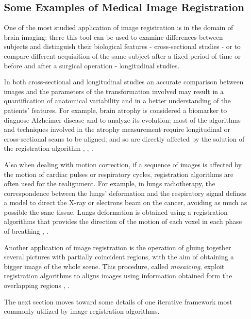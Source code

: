 \subsection{Some Examples of Medical Image Registration}
One of the most studied application of image registration is in the domain of brain imaging: there this tool can be used to examine differences between subjects and distinguish their biological features - cross-sectional studies - or to compare different acquisition of the same subject after a fixed period of time or before and after a surgical operation - longitudinal studies. 

In both cross-sectional and longitudinal studies an accurate comparison between images and the parameters of the transformation involved may result in a quantification of anatomical variability and in a better understanding of the patients' features. 
%
For example, brain atrophy is considered a biomarker to diagnose Alzheimer disease and to analyze its evolution; most of the algorithms and techniques involved in the atrophy measurement require longitudinal or cross-sectional scans to be aligned, and so are directly affected by the solution of the registration algorithm \cite{prados2015measuring}, \cite{fox1997brain}, \cite{gauthier2012prevention}. 

Also when dealing with motion correction, if a sequence of images is affected by the motion of cardiac pulses or respiratory cycles, registration algorithms are often used for the realignment. 
For example, in lungs radiotherapy, the correspondence between the lungs' deformation and the respiratory signal defines a model to direct the X-ray or electrons beam on the cancer, avoiding as much as possible the sane tissue. Lungs deformation is obtained using a registration algorithms that provides the direction of the motion of each voxel in each phase of breathing \cite{mcclelland}, \cite{mcclelland2011inter}.

Another application of image registration is the operation of gluing together several pictures with partially coincident regions, with the aim of obtaining a bigger image of the whole scene. This procedure, called \emph{mosaicing}, exploit registration algorithms to aligns images using information obtained form the overlapping regions \cite{vercauteren2006robust}, \cite{szeliski1994image}.

The next section moves toward some details of one iterative framework most commonly utilized by image registration algorithms.


